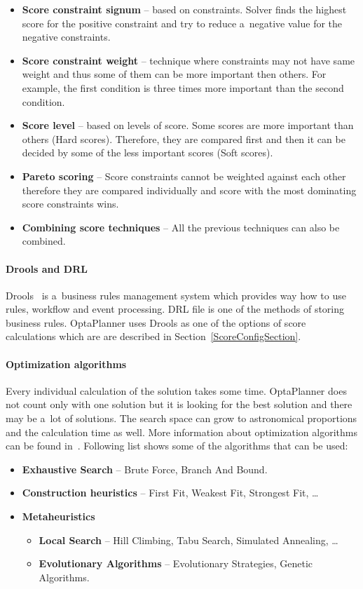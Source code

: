 \begin{itemize}
    \item \textbf{Score constraint signum} -- based on constraints. Solver finds the highest score for the positive
    constraint and try to reduce a~negative value for the negative constraints.
    \item \textbf{Score constraint weight} -- technique where constraints may not have same weight and thus some of them
    can be more important then others. For example, the first condition is three times more important than the second
    condition.
    \item \textbf{Score level} -- based on levels of score. Some scores are more important than others (Hard scores).
    Therefore, they are compared first and then it can be decided by some of the less important scores (Soft scores).
    \item \textbf{Pareto scoring} -- Score constraints cannot be weighted against each other therefore they are compared
    individually and score with the most dominating score constraints wins.
    \item \textbf{Combining score techniques} -- All the previous techniques can also be combined.
\end{itemize}

\paragraph{Drools and DRL}
Drools~\cite{Drools} is a~business rules management system which provides way how to use rules, workflow and event
processing. DRL file is one of the methods of storing business rules. OptaPlanner uses Drools as one of the options of
score calculations which are are described in Section~\ref{ScoreConfigSection}.

\paragraph{Optimization algorithms}
Every individual calculation of the solution takes some time. OptaPlanner does not count only with one solution but it
is looking for the best solution and there may be a~lot of solutions. The search space can grow to astronomical
proportions and the calculation time as well. More information about optimization algorithms can be found
in~\cite{OptaPlannerDoc}. Following list shows some of the algorithms that can be used:

\begin{itemize}
    \item \textbf{Exhaustive Search} -- Brute Force, Branch And Bound.
    \item \textbf{Construction heuristics} --  First Fit, Weakest Fit,  Strongest Fit, \dots
    \item \textbf{Metaheuristics}
    \begin{itemize}
        \item \textbf{Local Search} --  Hill Climbing, Tabu Search, Simulated Annealing, \dots
        \item \textbf{Evolutionary Algorithms} -- Evolutionary Strategies, Genetic Algorithms.
    \end{itemize}
\end{itemize}

